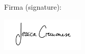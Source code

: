 \documentclass[12 pt , a4 paper , twoside , openright ]{book}
\begin{document}
\vspace{2cm}
\begin{flushright}
    Firma (signature):

    \includegraphics[width=4cm]{GRAPHS/firma_Jessica_Cremonese.jpg}
\end{flushright}


\tableofcontents


\mainmatter
    
    
    
    
    
    
    
    
    
    




\backmatter
\end{document}
